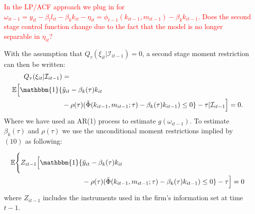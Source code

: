 \documentclass[11pt]{article}
\begin{document}
\textcolor{red}{In the LP/ACF approach we plug in for $\omega_{it-1}=y_{it}-\beta_{l}l_{it}-\beta_{k}k_{it}-\eta_{it}=\phi_{t-1}(k_{it-1}, m_{it-1})-\beta_{k}k_{it-1}$. Does the second stage control function change due to the fact that the model is no longer separable in $\eta_{it}$?}

With the assumption that $Q_{\tau}(\xi_{it}|\mathcal{I}_{it-1})=0$, a second stage moment restriction can then be written:
\begin{equation}
\begin{split}
Q_{\tau}(\xi_{it}|\mathcal{I}_{it-1})&=\\
\mathbb{E}\Big[\mathbbm{1}\{&\tilde{y}_{it}-\beta_{k}(\tau)k_{it}\\
&-\rho(\tau)(\tilde{\Phi}(k_{it-1}, m_{it-1}; \tau)-\beta_{k}(\tau)k_{it-1})\leq 0\}-\tau|\mathcal{I}_{it-1}\Big]=0.
\end{split}
\end{equation}
Where we have used an AR(1) process to estimate $g(\omega_{it-1})$. To estimate $\beta_{k}(\tau)$ and $\rho(\tau)$ we use the unconditional moment restrictions implied by $(10)$ as following: 

\begin{equation}
\begin{split}
\mathbb{E}\Bigg\{Z_{it-1} \Big[\mathbbm{1}\{&\tilde{y}_{it}-\beta_{k}(\tau)k_{it}\\
&-\rho(\tau)(\tilde{\Phi}(k_{it-1}, m_{it-1}; \tau)-\beta_{k}(\tau)k_{it-1})\leq 0\}-\tau\Big]=0
\end{split}
\end{equation}
where $Z_{it-1}$ includes the instruments used in the firm's information set at time $t-1$.
\end{document}
